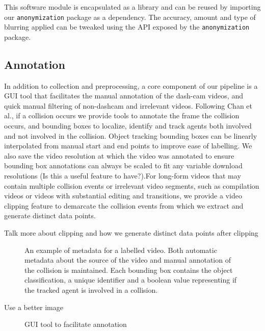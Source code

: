 \documentclass[letterpaper, 10 pt, conference]{IEEEconf}
\newcommand{\todo}[1]{{\color{red}#1}}
\begin{document}
This software module is encapsulated as a library and can be reused by importing our \texttt{anonymization} package as a dependency. The accuracy, amount and type of blurring applied can be tweaked using the API exposed by the \texttt{anonymization} package.

\subsection{Annotation}

In addition to collection and preprocessing, a core component of our pipeline is a GUI tool that facilitates the manual annotation of the dash-cam videos, and quick manual filtering of non-dashcam and irrelevant videos. Following Chan et al.\cite{chan2016anticipating}, if a collision occurs we provide tools to annotate the frame the collision occurs, and bounding boxes to localize, identify and track agents both involved and not involved in the collision. Object tracking bounding boxes can be linearly interpolated from manual start and end points to improve ease of labelling. We also save the video resolution at which the video was annotated to ensure bounding box annotations can always be scaled to fit any variable download resolutions (\todo{Is this a useful feature to have?}).For long-form videos that may contain multiple collision events or irrelevant video segments, such as compilation videos or videos with substantial editing and transitions, we provide a video clipping feature to demarcate the collision events from which we extract and generate distinct data points. 

\todo{Talk more about clipping and how we generate distinct data points after clipping}



\begin{figure}[htpb]
		\centering
		\caption{An example of metadata for a labelled video. Both automatic metadata about the source of the video and manual annotation of the collision is maintained. Each bounding box contains the object classification, a unique identifier and a boolean value representing if the tracked agent is involved in a collision.}
		\label{fig:images-example_metadata-png}
\end{figure}


\todo{Use a better image}

\begin{figure}[htpb]
		\centering
		\caption{GUI tool to facilitate annotation}
		\label{fig:example_gui_tool-png}
\end{figure}
\end{document}
